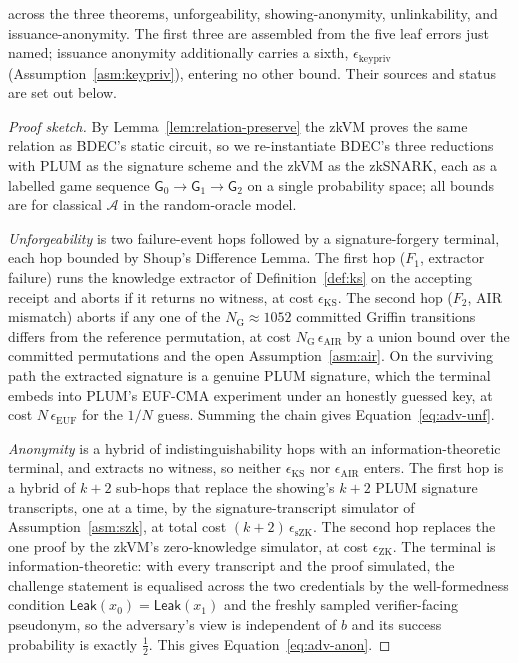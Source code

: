 \begin{theorem}
across the three theorems, unforgeability, showing-anonymity, unlinkability, and issuance-anonymity. The first three are assembled from the five leaf errors just named; issuance anonymity additionally carries a sixth, $\epsilon_{\mathrm{keypriv}}$ (Assumption~\ref{asm:keypriv}), entering no other bound. Their sources and status are set out below.
\end{theorem}

\begin{proof}[Proof sketch]
    By Lemma~\ref{lem:relation-preserve} the zkVM proves the same relation as BDEC's static circuit, so we re-instantiate BDEC's three reductions with PLUM as the signature scheme and the zkVM as the zkSNARK, each as a labelled game sequence $\mathsf G_0\to\mathsf G_1\to\mathsf G_2$ on a single probability space; all bounds are for classical $\mathcal A$ in the random-oracle model.
    
    \emph{Unforgeability} is two failure-event hops followed by a signature-forgery terminal, each hop bounded by Shoup's Difference Lemma. The first hop ($F_1$, extractor failure) runs the knowledge extractor of Definition~\ref{def:ks} on the accepting receipt and aborts if it returns no witness, at cost $\epsilon_{\mathrm{KS}}$. The second hop ($F_2$, AIR mismatch) aborts if any one of the $N_{\mathrm G}\approx1052$ committed Griffin transitions differs from the reference permutation, at cost $N_{\mathrm G}\,\epsilon_{\mathrm{AIR}}$ by a union bound over the committed permutations and the open Assumption~\ref{asm:air}. On the surviving path the extracted signature is a genuine PLUM signature, which the terminal embeds into PLUM's EUF-CMA experiment under an honestly guessed key, at cost $N\,\epsilon_{\mathrm{EUF}}$ for the $1/N$ guess. Summing the chain gives Equation~\eqref{eq:adv-unf}.
    
    \emph{Anonymity} is a hybrid of indistinguishability hops with an information-theoretic terminal, and extracts no witness, so neither $\epsilon_{\mathrm{KS}}$ nor $\epsilon_{\mathrm{AIR}}$ enters. The first hop is a hybrid of $k+2$ sub-hops that replace the showing's $k+2$ PLUM signature transcripts, one at a time, by the signature-transcript simulator of Assumption~\ref{asm:szk}, at total cost $(k+2)\,\epsilon_{\mathrm{sZK}}$. The second hop replaces the one proof by the zkVM's zero-knowledge simulator, at cost $\epsilon_{\mathrm{ZK}}$. The terminal is information-theoretic: with every transcript and the proof simulated, the challenge statement is equalised across the two credentials by the well-formedness condition $\mathsf{Leak}(x_0)=\mathsf{Leak}(x_1)$ and the freshly sampled verifier-facing pseudonym, so the adversary's view is independent of $b$ and its success probability is exactly $\tfrac12$. This gives Equation~\eqref{eq:adv-anon}.
    

\end{proof}

